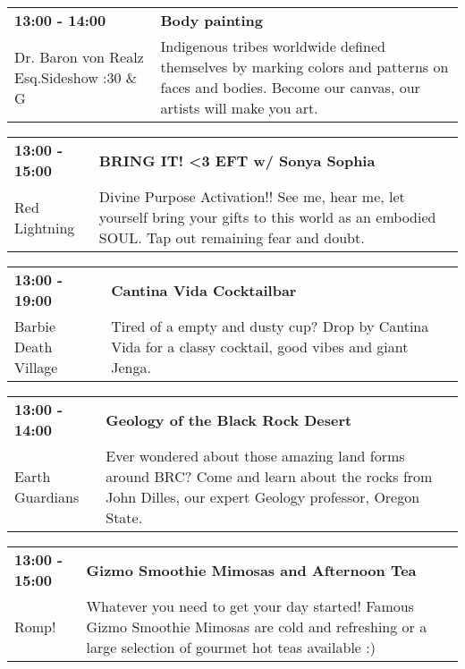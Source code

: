 \begin{tabular}{ p{1in} p{2.2in} }
    \textbf{13:00 - 14:00} & \textbf{Body painting} \\
    Dr. Baron von Realz Esq.Sideshow \newline 4:30 \& G & Indigenous tribes worldwide defined themselves by marking colors and patterns on faces and bodies. Become our canvas, our artists will make you art. \\
    \hline 
\end{tabular}
    
\begin{tabular}{ p{1in} p{2.2in} }
    \textbf{13:00 - 15:00} & \textbf{BRING IT! <3 EFT w/ Sonya Sophia} \\
    Red Lightning \newline  & Divine Purpose Activation!!  See me, hear me, let yourself bring your gifts to this world as an embodied SOUL. Tap out remaining fear and doubt. \\
    \hline 
\end{tabular}
    
\begin{tabular}{ p{1in} p{2.2in} }
    \textbf{13:00 - 19:00} & \textbf{Cantina Vida Cocktailbar} \\
    Barbie Death Village \newline  & Tired of a empty and dusty cup? Drop by Cantina Vida for a classy cocktail, good vibes and giant Jenga. \\
    \hline 
\end{tabular}
    
\begin{tabular}{ p{1in} p{2.2in} }
    \textbf{13:00 - 14:00} & \textbf{Geology of the Black Rock Desert} \\
    Earth Guardians \newline  & Ever wondered about those amazing land forms around BRC? Come and learn about the rocks from John Dilles, our expert Geology professor, Oregon State. \\
    \hline 
\end{tabular}
    
\begin{tabular}{ p{1in} p{2.2in} }
    \textbf{13:00 - 15:00} & \textbf{Gizmo Smoothie Mimosas and Afternoon Tea} \\
    Romp! \newline  & Whatever you need to get your day started! Famous Gizmo Smoothie Mimosas are cold and refreshing or a large selection of gourmet hot teas available :) \\
    \hline 
\end{tabular}
    
